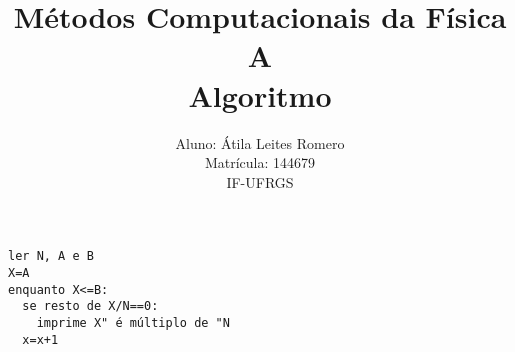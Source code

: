 \documentclass[brazilian,12pt,a4paper,final]{article}
\title{Métodos Computacionais da Física A \\ Algoritmo}
\author{Aluno: Átila Leites Romero \\ Matrícula: 144679 \\ IF-UFRGS}
\begin{document}
\maketitle

\begin{verbatim}
ler N, A e B
X=A
enquanto X<=B:
  se resto de X/N==0:
    imprime X" é múltiplo de "N
  x=x+1
\end{verbatim}
\end{document}
